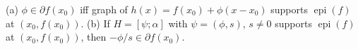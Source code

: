 (a) $\phi\in\partial f(x_0)$ iff graph of $h(x)=f(x_0)+\phi(x-x_0)$ supports $\operatorname{epi}(f)$ at $(x_0,f(x_0))$. (b) If $H=[\psi;\alpha]$ with $\psi=(\phi,s)$, $s\neq0$ supports $\operatorname{epi}(f)$ at $(x_0,f(x_0))$, then $-\phi/s\in\partial f(x_0)$.
